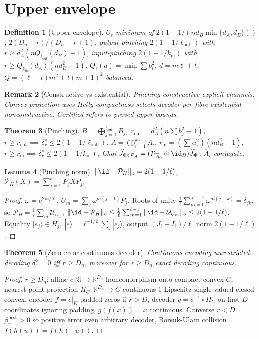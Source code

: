 \documentclass[11pt,a4paper]{article}
\newtheorem{theorem}{Theorem}[section]
\newtheorem{lemma}[theorem]{Lemma}
\newtheorem{definition}[theorem]{Definition}
\newtheorem{remark}[theorem]{Remark}
\begin{document}
\section{Upper envelope}
\begin{definition}[Upper envelope]
$U_r$ minimum of $2(1-1/(nd_B\min\{d_A,d_B\}))$, $2(D_n-r)/(D_n-r+1)$, output-pinching $2(1-1/\ell_{\mathrm{out}})$ with $r\ge d_A^2(nQ_{\ell_{\mathrm{out}}}(d_B)-1)$, input-pinching $2(1-1/k_{\mathrm{in}})$ with $r\ge Q_{k_{\mathrm{in}}}(d_A)(nd_B^2-1)$, $Q_\ell(d)=\min\sum b_i^2$, $d=m\ell+t$, $Q=(\ell-t)m^2+t(m+1)^2$ balanced.
\end{definition}
\begin{remark}[Constructive vs existential]
Pinching constructive explicit channels. Convex-projection uses Helly compactness selects decoder per fibre existential nonconstructive. Certified refers to proved upper bounds.
\end{remark}
\begin{theorem}[Pinching]
$B=\bigoplus_{j=1}^{\ell_{\mathrm{out}}}B_j$, $r_{\mathrm{out}}=d_A^2(n\sum b_j^2-1)$, $r\ge r_{\mathrm{out}}\implies\delta_r^\diamond\le2(1-1/\ell_{\mathrm{out}})$. $A=\bigoplus_{i=1}^{k_{\mathrm{in}}}A_i$, $r_{\mathrm{in}}=(\sum a_i^2)(nd_B^2-1)$, $r\ge r_{\mathrm{in}}\implies\delta_r^\diamond\le2(1-1/k_{\mathrm{in}})$. Choi $\widehat J_{\Phi\circ\mathcal P_A}=(\mathcal P_{\overline A_0}\otimes\id_B)\widehat J_\Phi$, $\overline A_i$ conjugate.
\end{theorem}
\begin{lemma}[Pinching norm]
$\|\id-\mathcal P_H\|_\diamond=2(1-1/\ell)$, $\mathcal P_H(X)=\sum_{j=1}^\ell P_jXP_j$.
\end{lemma}
\begin{proof}
$\omega=e^{2\pi i/\ell}$, $U_m=\sum_j\omega^{m(j-1)}P_j$. Roots-of-unity $\frac1\ell\sum_{m=0}^{\ell-1}\omega^{m(j-k)}=\delta_{jk}$, so $\mathcal P_H=\frac1\ell\sum_m\mathcal U_{U_m}$, $\|\id-\mathcal P_H\|_\diamond\le\frac1\ell\sum_{m=1}^{\ell-1}\|\id-\mathcal U_{U_m}\|_\diamond\le2(1-1/\ell)$. Equality $|e_j\rangle\in H_j$, $|e\rangle=\ell^{-1/2}\sum_j|e_j\rangle$, output $(J_\ell-I_\ell)/\ell$ norm $2(1-1/\ell)$.
\end{proof}
\begin{theorem}[Zero-error continuous decoder]
Continuous encoding unrestricted decoding $\delta_r^\diamond=0$ iff $r\ge D_n$, moreover for $r\ge D_n$ exact decoding continuous.
\end{theorem}
\begin{proof}
$r\ge D_n$: affine $c:\mathfrak A\to\mathbb R^{D_n}$ homeomorphism onto compact convex $C$, nearest-point projection $\Pi_C:\mathbb R^{D_n}\to C$ continuous $1$-Lipschitz single-valued closed convex, encoder $f=c|_K$ padded zeros if $r>D$, decoder $g=c^{-1}\circ\Pi_C$ on first $D$ coordinates ignoring padding, $g(f(x))=x$ continuous.
Converse $r<D$: $\beta_r^{\mathrm{best}}>0$ so positive error even arbitrary decoder, Borsuk-Ulam collision $f(h(u))=f(h(-u))$.
\end{proof}
\end{document}
